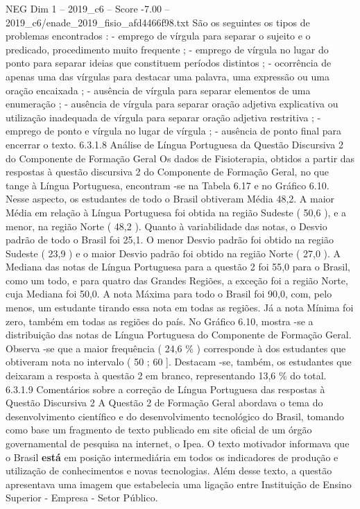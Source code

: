 \begin{textsample}{NEG Dim 1 – 2019\_c6 – Score -7.00 – 2019\_c6/enade\_2019\_fisio\_afd4466f98.txt}
São os seguintes os tipos de problemas encontrados : - emprego de vírgula para separar o sujeito e o predicado, procedimento muito frequente ; - emprego de vírgula no lugar do ponto para separar ideias que constituem períodos distintos ; - ocorrência de apenas uma das vírgulas para destacar uma palavra, uma expressão ou uma oração encaixada ; - ausência de vírgula para separar elementos de uma enumeração ; - ausência de vírgula para separar oração adjetiva explicativa ou utilização inadequada de vírgula para separar oração adjetiva restritiva ; - emprego de ponto e vírgula no lugar de vírgula ; - ausência de ponto final para encerrar o texto. 6.3.1.8 Análise de Língua Portuguesa da Questão Discursiva 2 do Componente de Formação Geral Os dados de Fisioterapia, obtidos a partir das respostas à questão discursiva 2 do Componente de Formação Geral, no que tange à Língua Portuguesa, encontram -se na Tabela 6.17 e no Gráfico 6.10.
Nesse aspecto, os estudantes de todo o Brasil obtiveram Média 48,2.
A maior Média em relação à Língua Portuguesa foi obtida na região Sudeste ( 50,6 ), e a menor, na região Norte ( 48,2 ).
Quanto à variabilidade das notas, o Desvio padrão de todo o Brasil foi 25,1.
O menor Desvio padrão foi obtido na região Sudeste ( 23,9 ) e o maior Desvio padrão foi obtido na região Norte ( 27,0 ).
A Mediana das notas de Língua Portuguesa para a questão 2 foi 55,0 para o Brasil, como um todo, e para quatro das Grandes Regiões, a exceção foi a região Norte, cuja Mediana foi 50,0.
A nota Máxima para todo o Brasil foi 90,0, com, pelo menos, um estudante tirando essa nota em todas as regiões.
Já a nota Mínima foi zero, também em todas as regiões do país.
No Gráfico 6.10, mostra -se a distribuição das notas de Língua Portuguesa do Componente de Formação Geral.
Observa -se que a maior frequência ( 24,6 \% ) corresponde à dos estudantes que obtiveram nota no intervalo ( 50 ; 60 ].
Destacam -se, também, os estudantes que deixaram a resposta à questão 2 em branco, representando 13,6 \% do total. 6.3.1.9 Comentários sobre a correção de Língua Portuguesa das respostas à Questão Discursiva 2 A Questão 2 de Formação Geral abordava o tema do desenvolvimento científico e do desenvolvimento tecnológico do Brasil, tomando como base um fragmento de texto publicado em site oficial de um órgão governamental de pesquisa na internet, o Ipea.
O texto motivador informava que o Brasil \textbf{está} em posição intermediária em todos os indicadores de produção e utilização de conhecimentos e novas tecnologias.
Além desse texto, a questão apresentava uma imagem que estabelecia uma ligação entre Instituição de Ensino Superior - Empresa - Setor Público.

\end{textsample}
